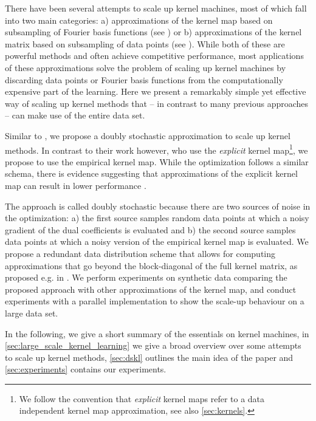 \documentclass{article} %
\begin{document}
There have been several attempts to scale up kernel machines, most of which fall into two main categories: a) approximations of the kernel map based on subsampling of Fourier basis functions (see \cite{Rahimi2008}) or b) approximations of the kernel matrix based on subsampling of data points (see \cite{Williams2000}).
%
While both of these are powerful methods and often achieve competitive performance, most applications of these approximations solve the problem of scaling up kernel machines by discarding data points or Fourier basis functions from the computationally expensive part of the learning. 
Here we present a remarkably simple yet effective way of scaling up kernel methods that -- in contrast to many previous approaches -- can make use of the entire data set. 

Similar to \cite{Dai2014}, we propose a doubly stochastic approximation to scale up kernel methods. In contrast to their work however, who use the {\em explicit} kernel map\footnote{We follow the convention that {\em explicit} kernel maps refer to a data independent kernel map approximation, see also \autoref{sec:kernels}.}, we propose to use the empirical kernel map. While the optimization follows a similar schema, there is evidence suggesting that approximations of the explicit kernel map can result in lower performance \cite{Yang2012}.

The approach is called doubly stochastic because there are two sources of noise in the optimization: a) the first source samples random data points at which a noisy gradient of the dual coefficients is evaluated and b) the second source samples data points at which a noisy version of the empirical kernel map is evaluated. We propose a redundant data distribution scheme that allows for computing approximations that go beyond the block-diagonal of the full kernel matrix, as proposed e.g. in \cite{Deisenroth2015}. We perform experiments on synthetic data comparing the proposed approach with other approximations of the kernel map, and conduct experiments with a parallel implementation to show the scale-up behaviour on a large data set. 

In the following, we give a short summary of the essentials on kernel machines, in \autoref{sec:large_scale_kernel_learning} we give a broad overview over some attempts to scale up kernel methods, \autoref{sec:dskl} outlines the main idea of the paper and \autoref{sec:experiments} contains our experiments.
\end{document}
